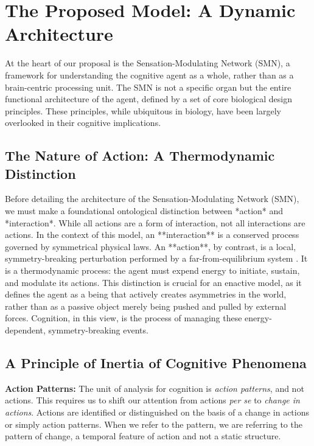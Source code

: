 \section{The Proposed Model: A Dynamic Architecture}
\label{sec:model}
At the heart of our proposal is the Sensation-Modulating Network (SMN), a framework for understanding the cognitive agent as a whole, rather than as a brain-centric processing unit. The SMN is not a specific organ but the entire functional architecture of the agent, defined by a set of core biological design principles. These principles, while ubiquitous in biology, have been largely overlooked in their cognitive implications.

\subsection{The Nature of Action: A Thermodynamic Distinction}
\label{subsec:action_nature}
Before detailing the architecture of the Sensation-Modulating Network (SMN), we must make a foundational ontological distinction between *action* and *interaction*. While all actions are a form of interaction, not all interactions are actions. In the context of this model, an **interaction** is a conserved process governed by symmetrical physical laws. An **action**, by contrast, is a local, symmetry-breaking perturbation performed by a far-from-equilibrium system \cite{prigogine2018order}. It is a thermodynamic process: the agent must expend energy to initiate, sustain, and modulate its actions. This distinction is crucial for an enactive model, as it defines the agent as a being that actively creates asymmetries in the world, rather than as a passive object merely being pushed and pulled by external forces. Cognition, in this view, is the process of managing these energy-dependent, symmetry-breaking events.

\subsection{A Principle of Inertia of Cognitive Phenomena}
\textbf{Action Patterns: }The unit of analysis for cognition is \textit{action patterns}, and not actions.  This requires us to shift our attention from actions \textit{per se} to \textit{change in actions}. Actions are identified or distinguished on the basis of a change in actions or simply action patterns. When we refer to the pattern, we are referring to the pattern of change, a temporal feature of action and not a static structure. 

